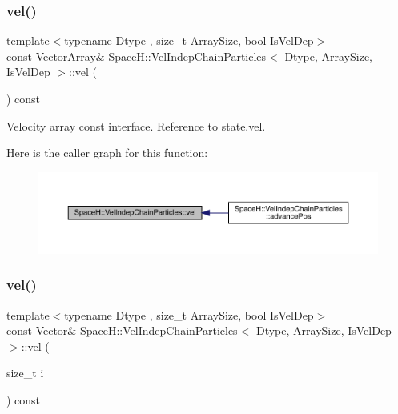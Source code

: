 \subsubsection{\texorpdfstring{vel()}{vel()}\hspace{0.1cm}{\footnotesize\ttfamily [1/2]}}
{\footnotesize\ttfamily template$<$typename Dtype , size\+\_\+t Array\+Size, bool Is\+Vel\+Dep$>$ \\
const \mbox{\hyperlink{class_space_h_1_1_vel_indep_particles_aa9983058940249df8b00fa800e8cbad2}{Vector\+Array}}\& \mbox{\hyperlink{class_space_h_1_1_vel_indep_chain_particles}{Space\+H\+::\+Vel\+Indep\+Chain\+Particles}}$<$ Dtype, Array\+Size, Is\+Vel\+Dep $>$\+::vel (\begin{DoxyParamCaption}{ }\end{DoxyParamCaption}) const\hspace{0.3cm}{\ttfamily [inline]}}



Velocity array const interface. Reference to state.\+vel. 

Here is the caller graph for this function\+:
\nopagebreak
\begin{figure}[H]
\begin{center}
\leavevmode
\includegraphics[width=350pt]{class_space_h_1_1_vel_indep_chain_particles_aadbc08f6cf8da3e46eb8d6c619e30c2f_icgraph}
\end{center}
\end{figure}
\mbox{\label{class_space_h_1_1_vel_indep_chain_particles_a28464b3a1352cbab4a7a59a03b38ab85}} 
\subsubsection{\texorpdfstring{vel()}{vel()}\hspace{0.1cm}{\footnotesize\ttfamily [2/2]}}
{\footnotesize\ttfamily template$<$typename Dtype , size\+\_\+t Array\+Size, bool Is\+Vel\+Dep$>$ \\
const \mbox{\hyperlink{class_space_h_1_1_vel_indep_particles_a61bbcfdb0dc7f99f3c68af69a755c935}{Vector}}\& \mbox{\hyperlink{class_space_h_1_1_vel_indep_chain_particles}{Space\+H\+::\+Vel\+Indep\+Chain\+Particles}}$<$ Dtype, Array\+Size, Is\+Vel\+Dep $>$\+::vel (\begin{DoxyParamCaption}\item[{size\+\_\+t}]{i }\end{DoxyParamCaption}) const\hspace{0.3cm}{\ttfamily [inline]}}




